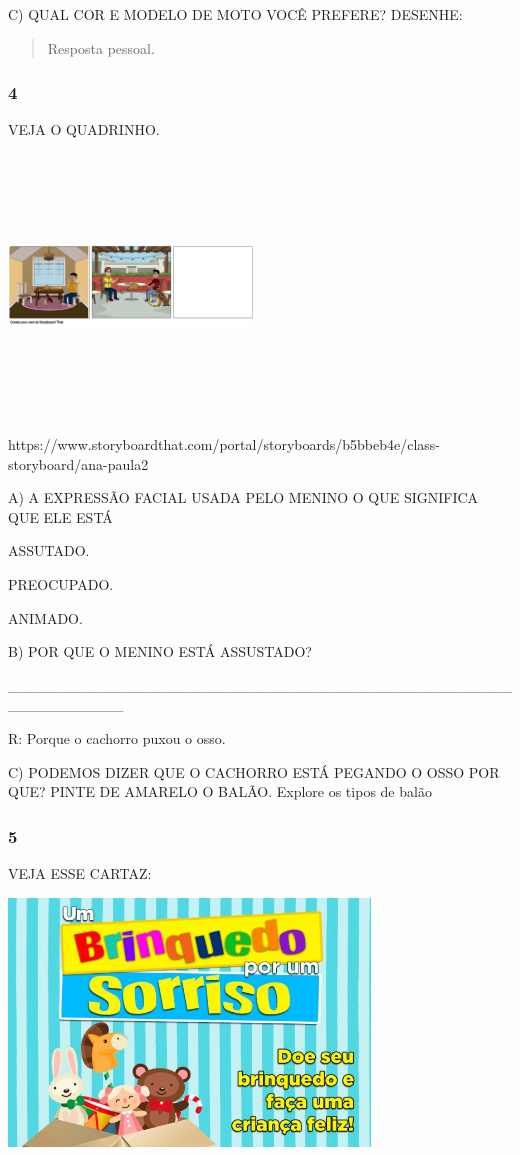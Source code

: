 C) QUAL COR E MODELO DE MOTO VOCÊ PREFERE? DESENHE:

\begin{quote}
Resposta pessoal.
\end{quote}

\subsubsection{4 }\label{section-84}

VEJA O QUADRINHO.

\includegraphics[width=2.57222in,height=2.73403in]{media/image131.png}

https://www.storyboardthat.com/portal/storyboards/b5bbeb4e/class-storyboard/ana-paula2

A) A EXPRESSÃO FACIAL USADA PELO MENINO O QUE SIGNIFICA QUE ELE ESTÁ

ASSUTADO.

PREOCUPADO.

ANIMADO.

B) POR QUE O MENINO ESTÁ ASSUSTADO?

\_\_\_\_\_\_\_\_\_\_\_\_\_\_\_\_\_\_\_\_\_\_\_\_\_\_\_\_\_\_\_\_\_\_\_\_\_\_\_\_\_\_\_\_\_\_\_\_\_\_\_\_\_\_\_\_\_\_\_

R: Porque o cachorro puxou o osso.

C) PODEMOS DIZER QUE O CACHORRO ESTÁ PEGANDO O OSSO POR QUE? PINTE DE
AMARELO O BALÃO. Explore os tipos de balão

\subsubsection{5 }\label{section-85}

VEJA ESSE CARTAZ:

\includegraphics[width=3.78169in,height=2.59560in]{media/image132.jpeg}

